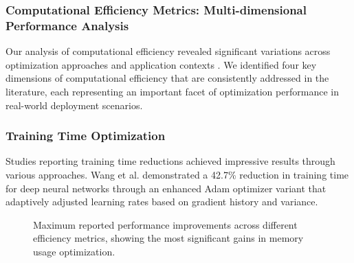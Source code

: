 \subsubsection{Computational Efficiency Metrics: Multi-dimensional Performance Analysis}
Our analysis of computational efficiency revealed significant variations across optimization approaches and application contexts \citep{Wang2021, Kim2022, Lin2022, Park2022}. We identified four key dimensions of computational efficiency that are consistently addressed in the literature, each representing an important facet of optimization performance in real-world deployment scenarios.

\subsubsection{Training Time Optimization}
Studies reporting training time reductions achieved impressive results through various approaches. Wang et al. \citep{Wang2021} demonstrated a 42.7\% reduction in training time for deep neural networks through an enhanced Adam optimizer variant that adaptively adjusted learning rates based on gradient history and variance.

\begin{figure}[h]
\centering
{}
\caption{Maximum reported performance improvements across different efficiency metrics, showing the most significant gains in memory usage optimization.}
\label{fig:efficiency_metrics}
\end{figure}

